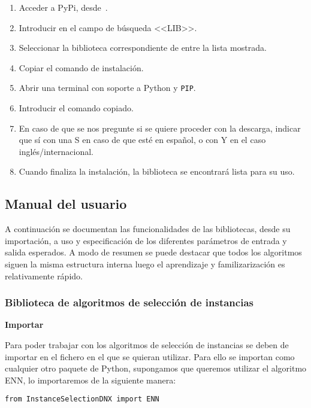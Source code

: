 \begin{enumerate}
\item Acceder a PyPi, desde~\cite{PyPI}.
\item Introducir en el campo de búsqueda <<LIB>>.
\item Seleccionar la biblioteca correspondiente de entre la lista mostrada.
\item Copiar el comando de instalación.
\item Abrir una terminal con soporte a Python y \texttt{PIP}.
\item Introducir el comando copiado.
\item En caso de que se nos pregunte si se quiere proceder con la descarga, indicar que sí con una S en caso de que esté en español, o con Y en el caso inglés/internacional.
\item Cuando finaliza la instalación, la biblioteca se encontrará lista para su uso.
\end{enumerate}



\subsection{Manual del usuario}

A continuación se documentan las funcionalidades de las bibliotecas, desde su importación, a uso y especificación de los diferentes parámetros de entrada y salida esperados. A modo de resumen se puede destacar que todos los algoritmos siguen la misma estructura interna luego el aprendizaje y familizarización es relativamente rápido.

\subsubsection{Biblioteca de algoritmos de selección de instancias}
\textbf{Importar}

Para poder trabajar con los algoritmos de selección de instancias se deben de importar en el fichero en el que se quieran utilizar. Para ello se importan como cualquier otro paquete de Python, supongamos que queremos utilizar el algoritmo ENN, lo importaremos de la siguiente manera:

\texttt{from InstanceSelectionDNX import ENN} 

